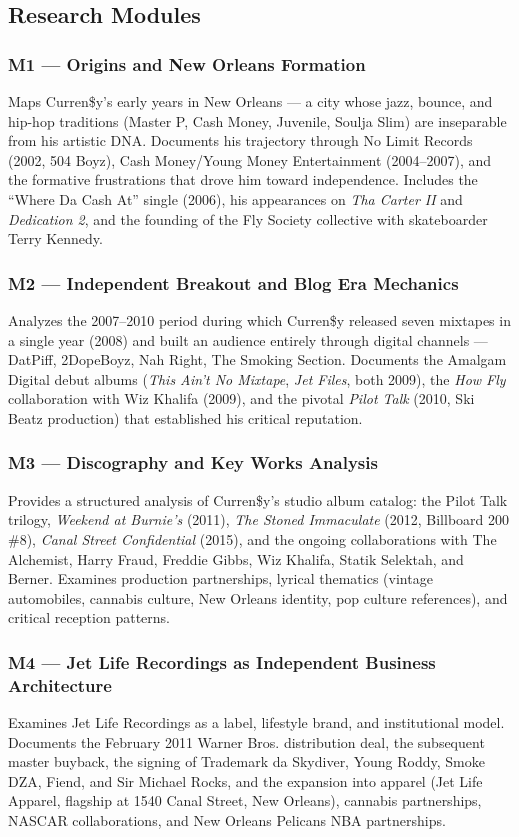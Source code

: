 \documentclass[11pt,letterpaper]{article}
\begin{document}
\subsection{Research Modules}

\subsubsection{M1 — Origins and New Orleans Formation}
Maps Curren\$y's early years in New Orleans — a city whose jazz, bounce, and hip-hop traditions (Master P, Cash Money, Juvenile, Soulja Slim) are inseparable from his artistic DNA. Documents his trajectory through No Limit Records (2002, 504 Boyz), Cash Money/Young Money Entertainment (2004–2007), and the formative frustrations that drove him toward independence. Includes the ``Where Da Cash At'' single (2006), his appearances on \textit{Tha Carter II} and \textit{Dedication 2}, and the founding of the Fly Society collective with skateboarder Terry Kennedy.

\subsubsection{M2 — Independent Breakout and Blog Era Mechanics}
Analyzes the 2007–2010 period during which Curren\$y released seven mixtapes in a single year (2008) and built an audience entirely through digital channels — DatPiff, 2DopeBoyz, Nah Right, The Smoking Section. Documents the Amalgam Digital debut albums (\textit{This Ain't No Mixtape}, \textit{Jet Files}, both 2009), the \textit{How Fly} collaboration with Wiz Khalifa (2009), and the pivotal \textit{Pilot Talk} (2010, Ski Beatz production) that established his critical reputation.

\subsubsection{M3 — Discography and Key Works Analysis}
Provides a structured analysis of Curren\$y's studio album catalog: the Pilot Talk trilogy, \textit{Weekend at Burnie's} (2011), \textit{The Stoned Immaculate} (2012, Billboard 200 \#8), \textit{Canal Street Confidential} (2015), and the ongoing collaborations with The Alchemist, Harry Fraud, Freddie Gibbs, Wiz Khalifa, Statik Selektah, and Berner. Examines production partnerships, lyrical thematics (vintage automobiles, cannabis culture, New Orleans identity, pop culture references), and critical reception patterns.

\subsubsection{M4 — Jet Life Recordings as Independent Business Architecture}
Examines Jet Life Recordings as a label, lifestyle brand, and institutional model. Documents the February 2011 Warner Bros. distribution deal, the subsequent master buyback, the signing of Trademark da Skydiver, Young Roddy, Smoke DZA, Fiend, and Sir Michael Rocks, and the expansion into apparel (Jet Life Apparel, flagship at 1540 Canal Street, New Orleans), cannabis partnerships, NASCAR collaborations, and New Orleans Pelicans NBA partnerships.
\end{document}
